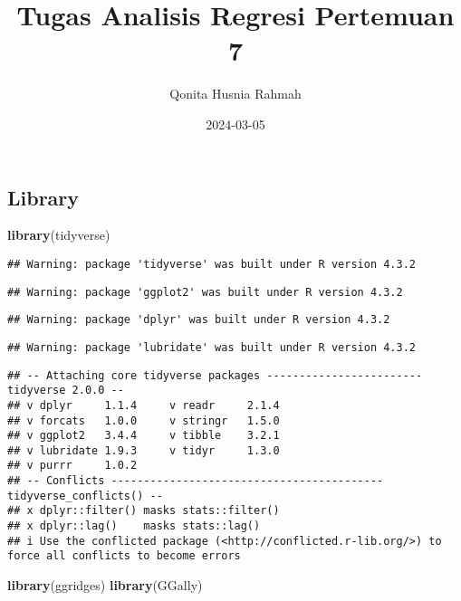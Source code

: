 \documentclass[
]{article}
\title{Tugas Analisis Regresi Pertemuan 7}
\author{Qonita Husnia Rahmah}
\date{2024-03-05}
\newenvironment{Shaded}{\begin{snugshade}}{\end{snugshade}}
\newcommand{\FunctionTok}[1]{\textcolor[rgb]{0.13,0.29,0.53}{\textbf{#1}}}
\newcommand{\NormalTok}[1]{#1}
\begin{document}
\maketitle

\hypertarget{library}{%
\subsection{Library}\label{library}}

\begin{Shaded}
\begin{Highlighting}[]
\FunctionTok{library}\NormalTok{(tidyverse)}
\end{Highlighting}
\end{Shaded}

\begin{verbatim}
## Warning: package 'tidyverse' was built under R version 4.3.2
\end{verbatim}

\begin{verbatim}
## Warning: package 'ggplot2' was built under R version 4.3.2
\end{verbatim}

\begin{verbatim}
## Warning: package 'dplyr' was built under R version 4.3.2
\end{verbatim}

\begin{verbatim}
## Warning: package 'lubridate' was built under R version 4.3.2
\end{verbatim}

\begin{verbatim}
## -- Attaching core tidyverse packages ------------------------ tidyverse 2.0.0 --
## v dplyr     1.1.4     v readr     2.1.4
## v forcats   1.0.0     v stringr   1.5.0
## v ggplot2   3.4.4     v tibble    3.2.1
## v lubridate 1.9.3     v tidyr     1.3.0
## v purrr     1.0.2     
## -- Conflicts ------------------------------------------ tidyverse_conflicts() --
## x dplyr::filter() masks stats::filter()
## x dplyr::lag()    masks stats::lag()
## i Use the conflicted package (<http://conflicted.r-lib.org/>) to force all conflicts to become errors
\end{verbatim}

\begin{Shaded}
\begin{Highlighting}[]
\FunctionTok{library}\NormalTok{(ggridges)}
\FunctionTok{library}\NormalTok{(GGally)}
\end{Highlighting}
\end{Shaded}
\end{document}
